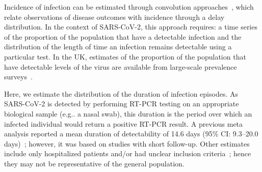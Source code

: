 \documentclass[referee,useAMS,usenatbib]{biom}
\makeatletter
\DeclareRobustCommand\onedot{\futurelet\@let@token\@onedot}
\def\@onedot{\ifx\@let@token.\else.\null\fi\xspace}
\def\eg{e.g\onedot} \def\Eg{{E.g}\onedot}
\def\ie{i.e\onedot} \def\Ie{{I.e}\onedot}
\makeatother
\begin{document}
Incidence of infection can be estimated through convolution approaches~\citep[e.g.][]{brookmeyerBackcalculation},  which relate observations of disease outcomes with incidence through a delay distribution.
In the context of SARS-CoV-2, this approach requires: a time series of the proportion of the population that have a detectable infection and the distribution of the length of time an infection remains detectable using a particular test.
In the UK, estimates of the proportion of the population that have detectable levels of the virus are available from large-scale prevalence surveys~\citep{cisMethodsONS,rileyREACT}.

Here, we estimate the distribution of the duration of infection episodes.
As SARS-CoV-2 is detected by performing RT-PCR testing on an appropriate biological sample (\eg a nasal swab), this duration is the period over which an infected individual would return a positive RT-PCR result.
A previous meta analysis reported a mean duration of detectability of 14.6 days (95\% CI: 9.3--20.0 days)~\citep{cevikShedding}; however, it was based on studies with short follow-up.
Other estimates include only hospitalized patients and/or had unclear inclusion criteria~\citep{ealesCharacterising,hellewellPCRSensitivity}; hence they may not be representative of the general population.

\end{document}
